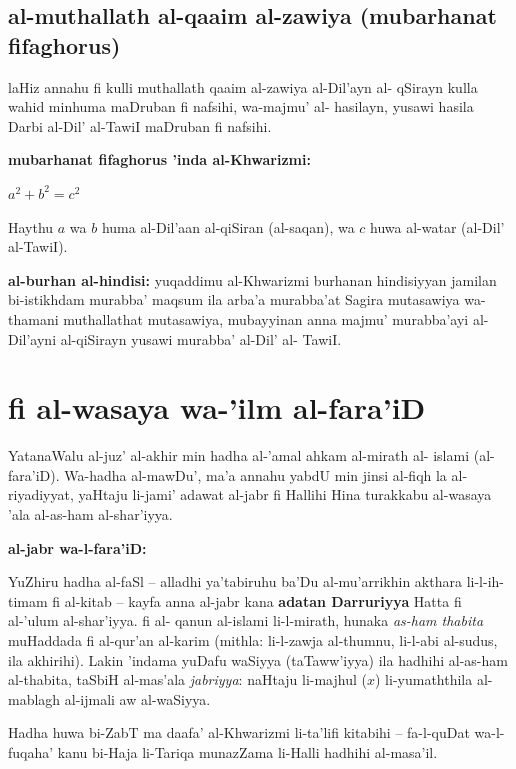 \documentclass[11pt,a4paper]{book}
\begin{document}
\section{al-muthallath al-qaaim al-zawiya (mubarhanat fifaghorus)}

\begin{originaltext}
laHiz annahu fi kulli muthallath qaaim al-zawiya al-Dil'ayn al-
qSirayn kulla wahid minhuma maDruban fi nafsihi, wa-majmu' al-
hasilayn, yusawi hasila Darbi al-Dil' al-TawiI maDruban fi nafsihi.
\end{originaltext}

\begin{geombox}
\textbf{mubarhanat fifaghorus 'inda al-Khwarizmi:}

\begin{center}
$\boxed{a^2 + b^2 = c^2}$
\end{center}

Haythu $a$ wa $b$ huma al-Dil'aan al-qiSiran (al-saqan), wa $c$ huwa
al-watar (al-Dil' al-TawiI).

\textbf{al-burhan al-hindisi:} yuqaddimu al-Khwarizmi burhanan
hindisiyyan jamilan bi-istikhdam murabba' maqsum ila arba'a murabba'at
Sagira mutasawiya wa-thamani muthallathat mutasawiya, mubayyinan anna
majmu' murabba'ayi al-Dil'ayni al-qiSirayn yusawi murabba' al-Dil' al-
TawiI.
\end{geombox}

\newpage

\chapter{fi al-wasaya wa-'ilm al-fara'iD}
\label{ch:legacies}

\begin{originaltext}
YatanaWalu al-juz' al-akhir min hadha al-'amal ahkam al-mirath al-
islami (al-fara'iD). Wa-hadha al-mawDu', ma'a annahu yabdU min
jinsi al-fiqh la al-riyadiyyat, yaHtaju li-jami' adawat al-jabr fi
Hallihi Hina turakkabu al-wasaya 'ala al-as-ham al-shar'iyya.
\end{originaltext}

\begin{commentary}
\textbf{al-jabr wa-l-fara'iD:}

YuZhiru hadha al-faSl -- alladhi ya'tabiruhu ba'Du al-mu'arrikhin
akthara li-l-ih-timam fi al-kitab -- kayfa anna al-jabr kana
\textbf{adatan Darruriyya} Hatta fi al-'ulum al-shar'iyya. fi al-
qanun al-islami li-l-mirath, hunaka \textit{as-ham thabita}
muHaddada fi al-qur'an al-karim (mithla: li-l-zawja al-thumnu,
li-l-abi al-sudus, ila akhirihi). Lakin 'indama yuDafu waSiyya
(taTaww'iyya) ila hadhihi al-as-ham al-thabita, taSbiH al-mas'ala
\textit{jabriyya}: naHtaju li-majhul ($x$) li-yumaththila al-mablagh
al-ijmali aw al-waSiyya.

Hadha huwa bi-ZabT ma daafa' al-Khwarizmi li-ta'lifi kitabihi --
fa-l-quDat wa-l-fuqaha' kanu bi-Haja li-Tariqa munazZama li-Halli
hadhihi al-masa'il.
\end{commentary}
\end{document}
